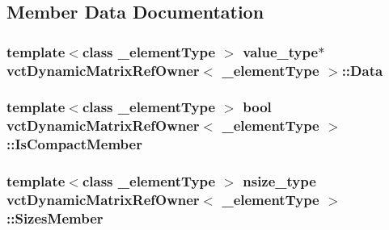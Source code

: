\subsection{Member Data Documentation}
\hypertarget{classvct_dynamic_matrix_ref_owner_a465f02e69e93e00a9fd586e4d89b6850}{
\subsubsection[{Data}]{\setlength{\rightskip}{0pt plus 5cm}template$<$class \-\_\-element\-Type $>$ value\-\_\-type$\ast$ {\bf vct\-Dynamic\-Matrix\-Ref\-Owner}$<$ \-\_\-element\-Type $>$\-::Data\hspace{0.3cm}{\ttfamily [protected]}}}\label{classvct_dynamic_matrix_ref_owner_a465f02e69e93e00a9fd586e4d89b6850}
\hypertarget{classvct_dynamic_matrix_ref_owner_a80b9ceef73131dead623c3e86f4f22a4}{
\subsubsection[{Is\-Compact\-Member}]{\setlength{\rightskip}{0pt plus 5cm}template$<$class \-\_\-element\-Type $>$ bool {\bf vct\-Dynamic\-Matrix\-Ref\-Owner}$<$ \-\_\-element\-Type $>$\-::Is\-Compact\-Member\hspace{0.3cm}{\ttfamily [protected]}}}\label{classvct_dynamic_matrix_ref_owner_a80b9ceef73131dead623c3e86f4f22a4}
\hypertarget{classvct_dynamic_matrix_ref_owner_a5b7725d1ef65ac16c0360b94c09f4a01}{
\subsubsection[{Sizes\-Member}]{\setlength{\rightskip}{0pt plus 5cm}template$<$class \-\_\-element\-Type $>$ nsize\-\_\-type {\bf vct\-Dynamic\-Matrix\-Ref\-Owner}$<$ \-\_\-element\-Type $>$\-::Sizes\-Member\hspace{0.3cm}{\ttfamily [protected]}}}\label{classvct_dynamic_matrix_ref_owner_a5b7725d1ef65ac16c0360b94c09f4a01}
